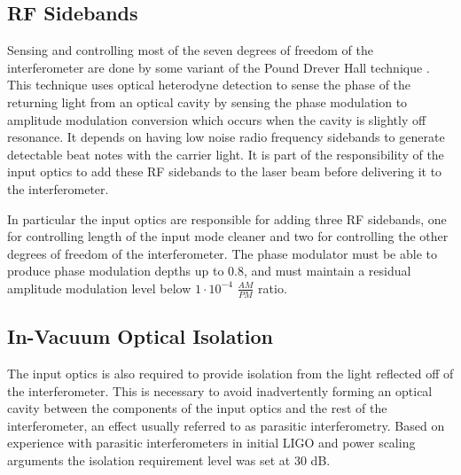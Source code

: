 \documentclass[10pt,a4paper]{article}
\begin{document}
\subsection{RF Sidebands}
Sensing and controlling most of the seven degrees of freedom of the interferometer are done by some 
variant of the Pound Drever Hall technique \cite{PDH}.  
This technique uses optical heterodyne detection to sense the phase of the returning light from 
an optical cavity by sensing the phase modulation to amplitude modulation conversion which occurs 
when the cavity is slightly off resonance.  
It depends on having low noise radio frequency sidebands to generate detectable beat notes 
with the carrier light.
It is part of the responsibility of the input optics to add these RF sidebands to the laser beam 
before delivering it to the interferometer.  

In particular the input optics are responsible for adding three RF sidebands, one for controlling 
length of the input mode cleaner and two for controlling the other degrees of freedom of the 
interferometer.  
The phase modulator must be able to produce phase modulation depths up to 0.8, and must 
maintain a residual amplitude modulation level below $1\cdot10^{-4}$ $\frac{AM}{PM}$ ratio.  


\subsection{In-Vacuum Optical Isolation}
The input optics is also required to provide isolation from the light reflected off of the 
interferometer.  
This is necessary to avoid inadvertently forming an optical cavity between the components 
of the input optics and the rest of the interferometer, 
an effect usually referred to as parasitic interferometry.  
Based on experience with parasitic interferometers in initial LIGO and power scaling arguments 
the isolation requirement level was set at 30 dB\cite{ligoT020020}.  


\end{document}
